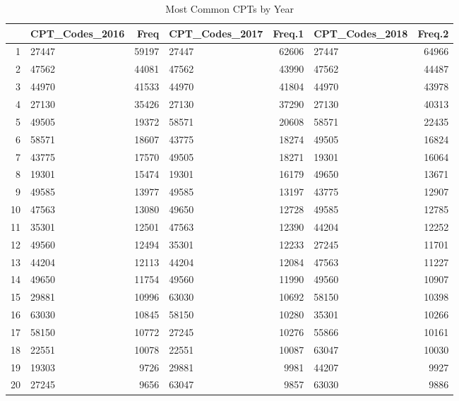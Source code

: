 \begin{table}[ht]
\centering
\begin{tabular}{rlrlrlr}
  \hline
 & CPT\_Codes\_2016 & Freq & CPT\_Codes\_2017 & Freq.1 & CPT\_Codes\_2018 & Freq.2 \\ 
  \hline
1 & 27447 & 59197 & 27447 & 62606 & 27447 & 64966 \\ 
  2 & 47562 & 44081 & 47562 & 43990 & 47562 & 44487 \\ 
  3 & 44970 & 41533 & 44970 & 41804 & 44970 & 43978 \\ 
  4 & 27130 & 35426 & 27130 & 37290 & 27130 & 40313 \\ 
  5 & 49505 & 19372 & 58571 & 20608 & 58571 & 22435 \\ 
  6 & 58571 & 18607 & 43775 & 18274 & 49505 & 16824 \\ 
  7 & 43775 & 17570 & 49505 & 18271 & 19301 & 16064 \\ 
  8 & 19301 & 15474 & 19301 & 16179 & 49650 & 13671 \\ 
  9 & 49585 & 13977 & 49585 & 13197 & 43775 & 12907 \\ 
  10 & 47563 & 13080 & 49650 & 12728 & 49585 & 12785 \\ 
  11 & 35301 & 12501 & 47563 & 12390 & 44204 & 12252 \\ 
  12 & 49560 & 12494 & 35301 & 12233 & 27245 & 11701 \\ 
  13 & 44204 & 12113 & 44204 & 12084 & 47563 & 11227 \\ 
  14 & 49650 & 11754 & 49560 & 11990 & 49560 & 10907 \\ 
  15 & 29881 & 10996 & 63030 & 10692 & 58150 & 10398 \\ 
  16 & 63030 & 10845 & 58150 & 10280 & 35301 & 10266 \\ 
  17 & 58150 & 10772 & 27245 & 10276 & 55866 & 10161 \\ 
  18 & 22551 & 10078 & 22551 & 10087 & 63047 & 10030 \\ 
  19 & 19303 & 9726 & 29881 & 9981 & 44207 & 9927 \\ 
  20 & 27245 & 9656 & 63047 & 9857 & 63030 & 9886 \\ 
   \hline
\end{tabular}
\caption{Most Common CPTs by Year} 
\end{table}
